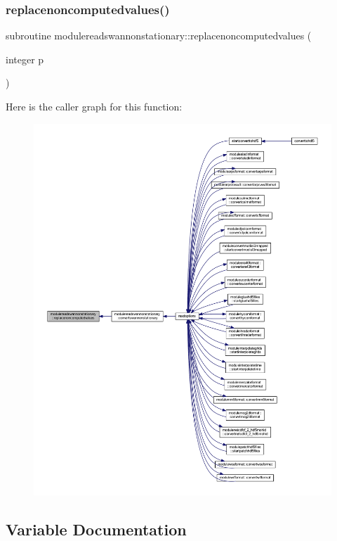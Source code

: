 \subsubsection{\texorpdfstring{replacenoncomputedvalues()}{replacenoncomputedvalues()}}
{\footnotesize\ttfamily subroutine modulereadswannonstationary\+::replacenoncomputedvalues (\begin{DoxyParamCaption}\item[{integer}]{p }\end{DoxyParamCaption})\hspace{0.3cm}{\ttfamily [private]}}

Here is the caller graph for this function\+:\nopagebreak
\begin{figure}[H]
\begin{center}
\leavevmode
\includegraphics[width=350pt]{namespacemodulereadswannonstationary_a209b3d9c5ca27190c2be35a7d9bb9bce_icgraph}
\end{center}
\end{figure}


\subsection{Variable Documentation}
\mbox{\label{namespacemodulereadswannonstationary_a540bd39474b6ce05d78950b2abf1c1af}} 
